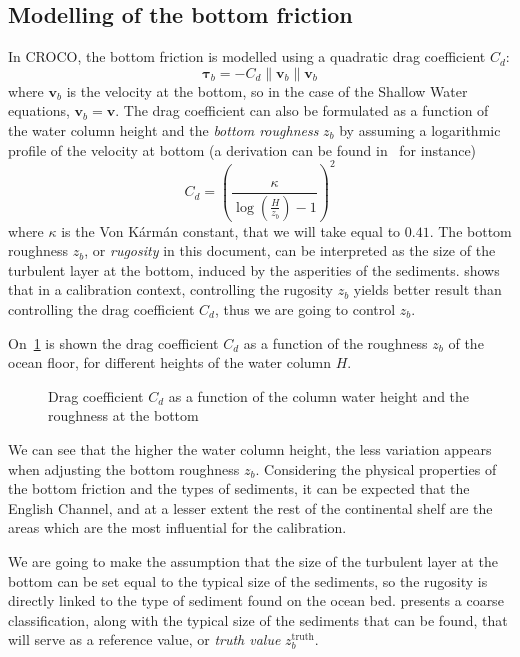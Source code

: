 \documentclass[../../Main_ManuscritThese.tex]{subfiles}
\newcommand{\CROCO}{CROCO}
\newcommand{\zob}{z_b}
\newcommand\imgpath{/home/victor/acadwriting/Manuscrit/Text/Chapter5/img/}
\begin{document}
\subsection{Modelling of the bottom friction}
\label{ssec:modelling_bottom}
In \CROCO, the bottom friction is modelled using a quadratic drag
coefficient $C_d$:
\begin{equation}
  \label{eq:bottom_stress_tau}
  \bm{\tau}_b= -C_d \|\mathbf{v}_b\|\mathbf{v}_b 
\end{equation}
where $\mathbf{v}_b$ is the velocity at the bottom, so in the case
of the Shallow Water equations, $\mathbf{v}_b = \mathbf{v}$.  The
drag coefficient can also be formulated as a function of the water
column height and the \emph{bottom roughness} $\zob$ by assuming a
logarithmic profile of the velocity at bottom (a derivation can be found in~\cite{le_bars_amandes_2010} for instance)
\begin{equation}
  \label{eq:quadratic_friction_vonkarman}
  C_d = \left(\frac{\kappa}{\log\left(\frac{H}{\zob}\right) - 1}\right)^2%
\end{equation}
where $\kappa$ is the Von K\'arm\'an constant, that we will take equal
to $0.41$.  The bottom roughness $\zob$, or \emph{rugosity} in this
document, can be interpreted as the size of the turbulent layer at the
bottom, induced by the asperities of the sediments.
\cite{boutet_estimation_2015} shows that in a calibration
context, controlling the rugosity $\zob$ yields better result than
controlling the drag coefficient $C_d$, thus we are going to control $\zob$.


On~\cref{fig:cd_zob} is shown the drag coefficient $C_d$ as a function
of the roughness $\zob$ of the ocean floor, for different heights of
the water column $H$.
\begin{figure}[ht]
  \centering 
  \caption{\label{fig:cd_zob} Drag coefficient $C_d$ as a function of
    the column water height and the roughness at the bottom}
\end{figure}
We can see that the higher the water column height, the less variation
appears when adjusting the bottom roughness $\zob$.  Considering the
physical properties of the bottom friction and the types of sediments,
it can be expected that the English Channel, and at a lesser extent
the rest of the continental shelf are the areas which are the most
influential for the calibration.


We are going to make the assumption that the size of the turbulent
layer at the bottom can be set equal to the typical size of the
sediments, so the rugosity is directly linked to the type of sediment
found on the ocean bed.  presents a coarse
classification, along with the typical size of the sediments that can
be found, that will serve as a reference value, or \emph{truth value}
$\zob^{\mathrm{truth}}$.  %
\end{document}
